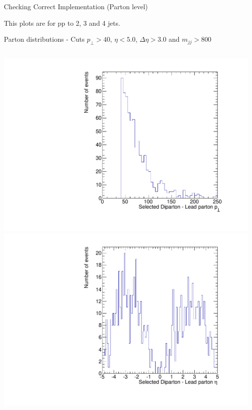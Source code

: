 \documentclass[8pt]{beamer}
\begin{document}
\begin{frame}{Checking Correct Implementation (Parton level)}

\begin{center}
\tiny
This plots are for pp to 2, 3 and 4 jets.
\end{center}
\vspace{-10px}

\begin{block}{Parton distributions - Cuts $p_\perp>40$, $\eta<5.0$, $\Delta\eta>3.0$ and $m_{jj}>800$}
  
\begin{columns}
  
  \centering
  \includegraphics[width=0.8\linewidth]{img/SelDiParton_Parton1_Pt.pdf} \\
  \includegraphics[width=0.8\linewidth]{img/SelDiParton_Parton1_Eta.pdf}
  

\end{columns}
\end{block}
\end{frame}
\end{document}
